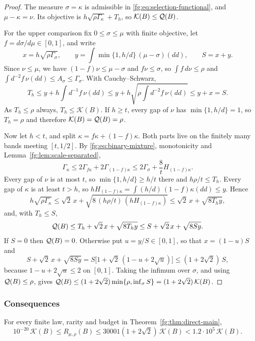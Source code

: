 \begin{proof}
The measure $\sigma=\kappa$ is admissible in
\eqref{fg:eq:selection-functional}, and $\mu-\kappa=\nu$. Its objective is
$h\sqrt{\rho\Gamma_\kappa}+T_h$, so $\mathcal K(B)\le\mathcal Q(B)$.

For the upper comparison fix $0\le\sigma\le\mu$ with finite objective,
let $f=d\sigma/d\mu\in[0,1]$, and write
\[
 x=h\sqrt{\rho\Gamma_\sigma},\qquad
 y=\int\min\{1,h/d\}\,(\mu-\sigma)(dd),\qquad S=x+y.
\]
Since $\nu\le\mu$, we have $(1-f)\nu\le\mu-\sigma$ and $f\nu\le\sigma$,
so $\int f\,d\nu\le\rho$ and $\int d^{-2}f\,\nu(dd)\le A_\sigma\le\Gamma_\sigma$.
With Cauchy--Schwarz,
\[
 T_h\le y+h\int d^{-1}f\,\nu(dd)
 \le y+h\sqrt{\rho\int d^{-2}f\,\nu(dd)}\le y+x=S.
\]
As $T_h\le\rho$ always, $T_h\le\mathcal K(B)$. If $h\ge t$, every gap of
$\nu$ has $\min\{1,h/d\}=1$, so $T_h=\rho$ and therefore
$\mathcal K(B)=\mathcal Q(B)=\rho$.

Now let $h<t$, and split $\kappa=f\kappa+(1-f)\kappa$. Both parts live
on the finitely many bands meeting $[t,1/2]$. By \eqref{fg:eq:binary-mixture},
monotonicity and Lemma~\ref{fg:lem:scale-separated},
\[
 \Gamma_\kappa\le2\Gamma_{f\kappa}+2\Gamma_{(1-f)\kappa}
 \le2\Gamma_\sigma+\frac8tH_{(1-f)\kappa}.
\]
Every gap of $\nu$ is at most $t$, so $\min\{1,h/d\}\ge h/t$ there and
$h\rho/t\le T_h$. Every gap of $\kappa$ is at least $t>h$, so
$hH_{(1-f)\kappa}=\int(h/d)\,(1-f)\kappa(dd)\le y$. Hence
\[
 h\sqrt{\rho\Gamma_\kappa}\le\sqrt2\,x
 +\sqrt{8\,(h\rho/t)\,(hH_{(1-f)\kappa})}\le\sqrt2\,x+\sqrt{8T_hy},
\]
and, with $T_h\le S$,
\[
 \mathcal Q(B)\le T_h+\sqrt2\,x+\sqrt{8T_hy}\le S+\sqrt2\,x+\sqrt{8Sy}.
\]
If $S=0$ then $\mathcal Q(B)=0$. Otherwise put $u=y/S\in[0,1]$, so that
$x=(1-u)S$ and
\[
 S+\sqrt2\,x+\sqrt{8Sy}=S\bigl[1+\sqrt2\,(1-u+2\sqrt u)\bigr]
 \le(1+2\sqrt2)\,S,
\]
because $1-u+2\sqrt u\le2$ on $[0,1]$. Taking the infimum over
$\sigma$, and using $\mathcal Q(B)\le\rho$, gives
$\mathcal Q(B)\le(1+2\sqrt2)\min\{\rho,\inf_\sigma S\}=(1+2\sqrt2)\,\mathcal K(B)$.
\end{proof}

\subsubsection{Consequences}
\begin{corollary}\label{fg:cor:selection-form}
For every finite law, rarity and budget in Theorem~\ref{fg:thm:direct-main},
\[
 10^{-20}\,\mathcal K(B)\le R_{\mu,\rho}(B)
 \le30001(1+2\sqrt2)\,\mathcal K(B)<1.2\cdot10^5\,\mathcal K(B).
\]
\end{corollary}

